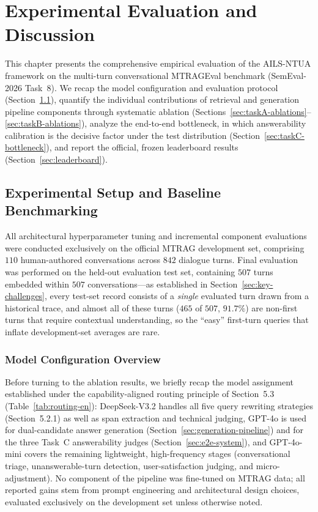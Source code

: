 \chapter{Experimental Evaluation and Discussion}
\label{chapter:evaluation}

This chapter presents the comprehensive empirical evaluation of the AILS-NTUA framework on the multi-turn conversational MTRAGEval benchmark (SemEval-2026 Task~8). We recap the model configuration and evaluation protocol (Section~\ref{sec:eval-setup}), quantify the individual contributions of retrieval and generation pipeline components through systematic ablation (Sections~\ref{sec:taskA-ablations}--\ref{sec:taskB-ablations}), analyze the end-to-end bottleneck, in which answerability calibration is the decisive factor under the test distribution (Section~\ref{sec:taskC-bottleneck}), and report the official, frozen leaderboard results (Section~\ref{sec:leaderboard}).

\section{Experimental Setup and Baseline Benchmarking}
\label{sec:eval-setup}

All architectural hyperparameter tuning and incremental component evaluations were conducted exclusively on the official MTRAG development set, comprising $110$ human-authored conversations across $842$ dialogue turns. Final evaluation was performed on the held-out evaluation test set, containing $507$ turns embedded within $507$ conversations---as established in Section~\ref{sec:key-challenges}, every test-set record consists of a \emph{single} evaluated turn drawn from a historical trace, and almost all of these turns ($465$ of $507$, $91.7\%$) are non-first turns that require contextual understanding, so the ``easy'' first-turn queries that inflate development-set averages are rare.

\subsection{Model Configuration Overview}
\label{sec:model-config-overview}

Before turning to the ablation results, we briefly recap the model assignment established under the capability-aligned routing principle of Section~5.3 (Table~\ref{tab:routing-en}): DeepSeek-V3.2 handles all five query rewriting strategies (Section~5.2.1) as well as span extraction and technical judging, GPT-4o is used for dual-candidate answer generation (Section~\ref{sec:generation-pipeline}) and for the three Task~C answerability judges (Section~\ref{sec:e2e-system}), and GPT-4o-mini covers the remaining lightweight, high-frequency stages (conversational triage, unanswerable-turn detection, user-satisfaction judging, and micro-adjustment). No component of the pipeline was fine-tuned on MTRAG data; all reported gains stem from prompt engineering and architectural design choices, evaluated exclusively on the development set unless otherwise noted.

